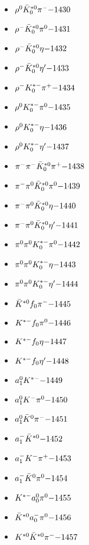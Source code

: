 \begin{multicols}{3}
\begin{itemize}
 \item $ \rho^{0} \bar{K}_{0}^{*0} \pi^{-} \hfill{-1430}$
 \item $ \rho^{-} \bar{K}_{0}^{*0} \pi^{0} \hfill{-1431}$
 \item $ \rho^{-} \bar{K}_{0}^{*0} \eta \hfill{-1432}$
 \item $ \rho^{-} \bar{K}_{0}^{*0} {\eta^{\prime}} \hfill{-1433}$
 \item $ \rho^{-} K_{0}^{*-} \pi^{+} \hfill{-1434}$
 \item $ \rho^{0} K_{0}^{*-} \pi^{0} \hfill{-1435}$
 \item $ \rho^{0} K_{0}^{*-} \eta \hfill{-1436}$
 \item $ \rho^{0} K_{0}^{*-} {\eta^{\prime}} \hfill{-1437}$
 \item $ \pi^{-} \pi^{-} \bar{K}_{0}^{*0} \pi^{+} \hfill{-1438}$
 \item $ \pi^{-} \pi^{0} \bar{K}_{0}^{*0} \pi^{0} \hfill{-1439}$
 \item $ \pi^{-} \pi^{0} \bar{K}_{0}^{*0} \eta \hfill{-1440}$
 \item $ \pi^{-} \pi^{0} \bar{K}_{0}^{*0} {\eta^{\prime}} \hfill{-1441}$
 \item $ \pi^{0} \pi^{0} K_{0}^{*-} \pi^{0} \hfill{-1442}$
 \item $ \pi^{0} \pi^{0} K_{0}^{*-} \eta \hfill{-1443}$
 \item $ \pi^{0} \pi^{0} K_{0}^{*-} {\eta^{\prime}} \hfill{-1444}$
 \item $ \bar{K}^{*0} f_{0} \pi^{-} \hfill{-1445}$
 \item $ K^{*-} f_{0} \pi^{0} \hfill{-1446}$
 \item $ K^{*-} f_{0} \eta \hfill{-1447}$
 \item $ K^{*-} f_{0} {\eta^{\prime}} \hfill{-1448}$
 \item $ a_{1}^{0} K^{*-} \hfill{-1449}$
 \item $ a_{1}^{0} K^{-} \pi^{0} \hfill{-1450}$
 \item $ a_{1}^{0} \bar{K}^{0} \pi^{-} \hfill{-1451}$
 \item $ a_{1}^{-} \bar{K}^{*0} \hfill{-1452}$
 \item $ a_{1}^{-} K^{-} \pi^{+} \hfill{-1453}$
 \item $ a_{1}^{-} \bar{K}^{0} \pi^{0} \hfill{-1454}$
 \item $ K^{*-} a_{0}^{0} \pi^{0} \hfill{-1455}$
 \item $ \bar{K}^{*0} a_{0}^{-} \pi^{0} \hfill{-1456}$
 \item $ K^{*0} \bar{K}^{*0} \pi^{-} \hfill{-1457}$

\end{itemize}
\end{multicols}
